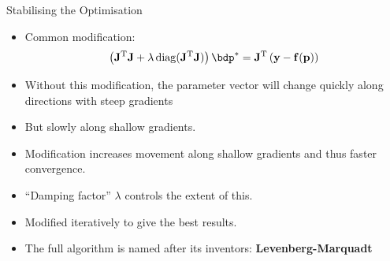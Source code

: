 \documentclass{beamer}
\begin{document}
\begin{frame}{Stabilising the Optimisation}
  \begin{itemize}
    \item Common modification:
      \begin{equation*}
        \left(\bJ^\rT\bJ+\lambda\diag(\bJ^\rT\bJ)\right)\bdp^* = \bJ^\rT\left(\by-\bf(\bp)\right)
      \end{equation*}
    \item Without this modification, the parameter vector will change quickly along directions with steep gradients
    \item But slowly along shallow gradients.
    \item Modification increases movement along shallow gradients and thus faster convergence.
    \item ``Damping factor'' $\lambda$ controls the extent of this.
    \item Modified iteratively to give the best results. 
    \item The full algorithm is named after its inventors: \textbf{Levenberg-Marquadt}
  \end{itemize}
\end{frame}
\end{document}
